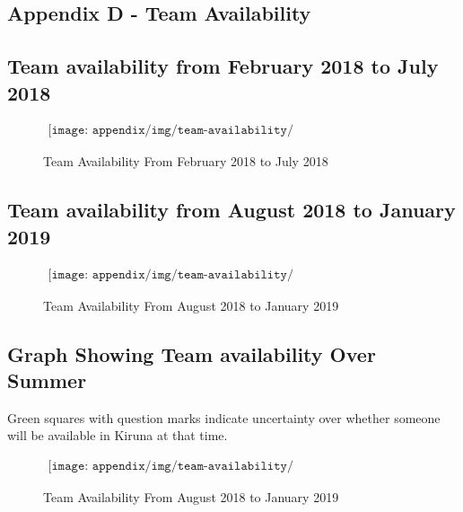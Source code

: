\begin{landscape}
\section{Appendix D - Team Availability} \label{sec:appD}

\subsection{Team availability from February 2018 to July 2018}

\begin{figure}[H]
    \begin{align*}
        \texttt{[image: appendix/img/team-availability/teamavaliabilitytojuly.png]}
    \end{align*}
    \caption{Team Availability From February 2018 to July 2018}
    \label{fig:team-availability-feb18-jul18}
\end{figure}

\end{landscape}

\pagebreak

\begin{landscape}

\subsection{Team availability from August 2018 to January 2019}

\begin{figure}[H]
    \begin{align*}
        \texttt{[image: appendix/img/team-availability/teamavaliabilitytojan.png]}
    \end{align*}
    \caption{Team Availability From August 2018 to January 2019}
    \label{fig:team-availability-aug18-jan19}
\end{figure}

\end{landscape}


\pagebreak

\begin{landscape}

\subsection{Graph Showing Team availability Over Summer}
Green squares with question marks indicate uncertainty over whether someone will be available in Kiruna at that time. 

\begin{figure}[H]
    \begin{align*}
        \texttt{[image: appendix/img/team-availability/summeravaliability.png]}
    \end{align*}
    \caption{Team Availability From August 2018 to January 2019}
    \label{fig:team-availability-aug18-jan19}
\end{figure}

\end{landscape}
